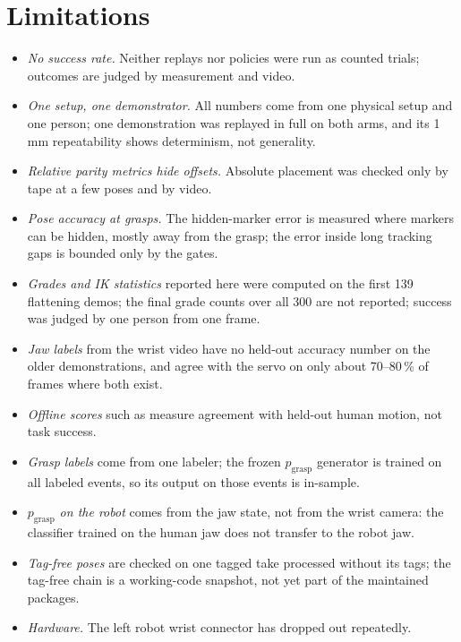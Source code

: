 \documentclass[conference,10pt]{IEEEtran}
\newcommand{\mm}{\,mm\xspace}
\begin{document}
\section{Limitations}\label{sec:limits}
\begin{itemize}
\item \emph{No success rate.} Neither replays nor policies were run as counted trials; outcomes are judged by measurement
  and video.
\item \emph{One setup, one demonstrator.} All numbers come from one physical setup and one person; one demonstration was
  replayed in full on both arms, and its 1\mm repeatability shows determinism, not generality.
\item \emph{Relative parity metrics hide offsets.} Absolute placement was checked only by tape at a few poses and by video.
\item \emph{Pose accuracy at grasps.} The hidden-marker error is measured where markers can be hidden, mostly away from
  the grasp; the error inside long tracking gaps is bounded only by the gates.
\item \emph{Grades and IK statistics} reported here were computed on the first 139 flattening demos; the final grade
  counts over all 300 are not reported; success was judged by one person from one frame.
\item \emph{Jaw labels} from the wrist video have no held-out accuracy number on the older demonstrations, and agree with
  the servo on only about 70--80\,\% of frames where both exist.
\item \emph{Offline scores} such as  measure agreement with held-out human motion, not task success.
\item \emph{Grasp labels} come from one labeler; the frozen $p_\mathrm{grasp}$ generator is trained on all labeled
  events, so its output on those events is in-sample.
\item \emph{$p_\mathrm{grasp}$ on the robot} comes from the jaw state, not from the wrist camera: the classifier trained on
  the human jaw does not transfer to the robot jaw.
\item \emph{Tag-free poses} are checked on one tagged take processed without its tags; the tag-free chain is a working-code
  snapshot, not yet part of the maintained packages.
\item \emph{Hardware.} The left robot wrist connector has dropped out repeatedly.
\end{itemize}

\end{document}
